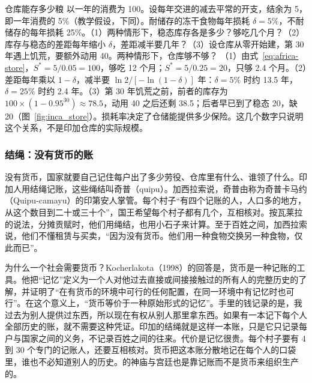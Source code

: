 \begin{example}{仓库能存多少粮}\label{ex:africa-store}
以一年的消费为 100。设每年交进的减去平常的开支，结余为 5，即一年消费的 5\%（教学假设，下同）。耐储存的冻干食物每年损耗 $\delta=5\%$，不耐储存的每年损耗 25\%。（1）两种情形下，稳态库存各是多少？够吃几个月？（2）库存与稳态的差距每年缩小 $\delta$，差距减半要几年？（3）设仓库从零开始建，第 30 年遇上饥荒，要额外动用 40。两种情形下，仓库够不够？
\solution （1）由式~\eqref{eq:africa-store}，$S^{*}=5/0.05=100$，够吃 12 个月；$S^{*}=5/0.25=20$，只够 2.4 个月。（2）差距每年乘以 $1-\delta$，减半要 $\ln2/[-\ln(1-\delta)]$ 年：$\delta=5\%$ 时约 13.5 年，$\delta=25\%$ 时约 2.4 年。（3）第 30 年饥荒之前，前者的库存为 $100\times(1-0.95^{30})\approx78.5$，动用 40 之后还剩 38.5；后者早已到了稳态 20，缺 20（图~\ref{fig:inca_store}）。损耗率决定了仓储能提供多少保险。这几个数字只说明这个关系，不是印加仓库的实际规模。
\end{example}


\subsubsection{结绳：没有货币的账}
没有货币，国家就要自己记住每户出了多少劳役、仓库里有什么、谁领了什么。印加人用结绳记账，这些绳结叫奇普（quipu）。加西拉索说，奇普由称为奇普卡马约（Quipu-camayu）的印第安人掌管。每个村子“有四个记账的人，人口多的地方，从这个数目到二十或三十个”，国王希望每个村子都有几个，互相核对\cite{garcilaso1869}。按瓦莱拉的说法，分摊贡赋时，他们用绳结，也用小石子来计算\cite{garcilaso1869}。至于百姓之间，加西拉索说，他们不懂租赁与买卖，“因为没有货币。他们用一种食物交换另一种食物，仅此而已”\cite{garcilaso1869}。

\begin{intuition}[货币是一种记忆]
为什么一个社会需要货币？Kocherlakota（1998）的回答是，货币是一种记账的工具。他把“记忆”定义为一个人对他过去直接或间接接触过的所有人的完整历史的了解，并证明了“在有货币的环境中可行的任何配置，在同一环境中有记忆时也可行”。在这个意义上，“货币等价于一种原始形式的记忆”\cite{kocherlakota1998}。手里的钱记录的是，我过去为别人提供过东西，所以现在有权从别人那里拿东西。如果有一本记下每个人全部历史的账，就不需要这种凭证。印加的结绳就是这样一本账，只是它只记录每户与国家之间的义务，不记录百姓之间的往来。代价是记忆很贵。每个村子要有 4 到 30 个专门的记账人，还要互相核对。货币把这本账分散地记在每个人的口袋里，谁也不必知道别人的历史。的神庙与宫廷也是靠记账而不是货币来组织生产的。
\end{intuition}

